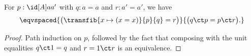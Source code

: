 %
\begin{thm}\label{thm:dpath-path}
  For $p:\id[A]a{a'}$ with $q:a=a$ and $r:a'=a'$, we have
  \[ \eqvspaced{ \big(\transfib{x\mapsto (x=x)}{p}{q} = r \big) }{ \big( q \ct p = p \ct r \big). } \]
\end{thm}

\begin{proof}
  Path induction on $p$, followed by the fact that composing with the unit equalities $q\ct 1 = q$ and $r = 1\ct r$ is an equivalence.
\end{proof}
